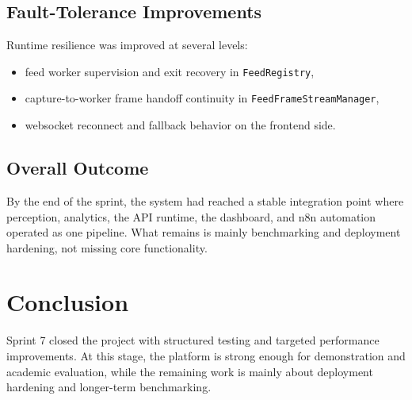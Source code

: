 \subsection{Fault-Tolerance Improvements}
Runtime resilience was improved at several levels:
\begin{itemize}
	\item feed worker supervision and exit recovery in \texttt{FeedRegistry},
	\item capture-to-worker frame handoff continuity in \texttt{FeedFrameStreamManager},
	\item websocket reconnect and fallback behavior on the frontend side.
\end{itemize}

\subsection{Overall Outcome}
By the end of the sprint, the system had reached a stable integration point where perception, analytics, the API runtime, the dashboard, and n8n automation operated as one pipeline. What remains is mainly benchmarking and deployment hardening, not missing core functionality.

\section{Conclusion}
Sprint 7 closed the project with structured testing and targeted performance improvements. At this stage, the platform is strong enough for demonstration and academic evaluation, while the remaining work is mainly about deployment hardening and longer-term benchmarking.
